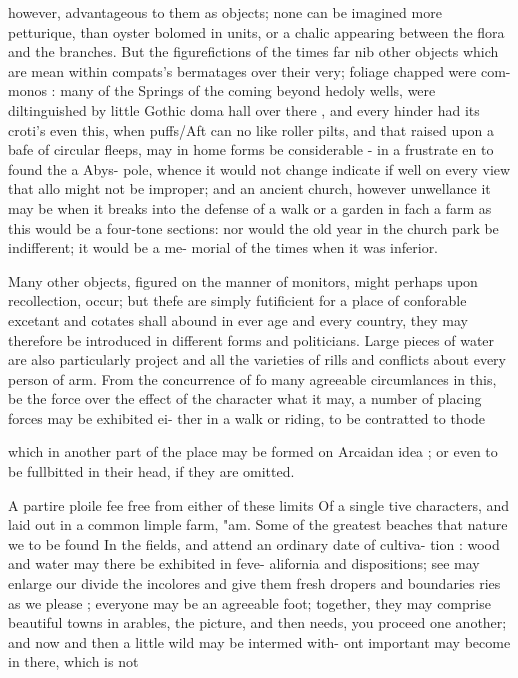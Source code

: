 however, advantageous to them as objects; none can
be imagined more petturique, than oyster bolomed
in units, or a chalic appearing between the flora and
the branches. But the figurefictions of the times far
nib other objects which are mean within compats’s
bermatages over their very; foliage chapped were com-
monos : many of the Springs of the coming beyond
hedoly wells, were diltinguished by little Gothic doma
hall over there , and every hinder had its croti's even
this, when puffs/Aft can no like roller pilts, and that
raised upon a bafe of circular fleeps, may in home forms
be considerable - in a frustrate en to found the a Abys-
pole, whence it would not change indicate if well on every view
that allo might not be improper; and an ancient church,
however unwellance it may be when it breaks into the
defense of a walk or a garden in fach a farm as this
would be a four-tone sections: nor would the old year
in the church park be indifferent; it would be a me-
morial of the times when it was inferior.\par\medskip
Many other objects, figured on the manner of
monitors, might perhaps upon recollection, occur; but
thefe are simply futificient for a place of conforable
excetant and cotates shall abound in ever age and
every country, they may therefore be introduced in
different forms and politicians. Large pieces of water
are also particularly project and all the varieties of
rills and conflicts about every person of arm. From
the concurrence of fo many agreeable circumlances in
this, be the force over the effect of the character what it
may, a number of placing forces may be exhibited ei-
ther in a walk or riding, to be contratted to thode\par\medskip
which in another part of the place may be formed on
Arcaidan idea ; or even to be fullbitted in their head,
if they are omitted.\par{} A partire ploile fee free from either of these limits Of a single
tive characters, and laid out in a common limple farm, "am.
Some of the greatest beaches that nature we to be found
In the fields, and attend an ordinary date of cultiva-
tion : wood and water may there be exhibited in feve-
alifornia and dispositions; see may enlarge our divide
the incolores and give them fresh dropers and boundaries
ries as we please ; everyone may be an agreeable foot;
together, they may comprise beautiful towns in arables,
the picture, and then needs, you proceed one another;
and now and then a little wild may be intermed with-
ont important may become in there, which is not
